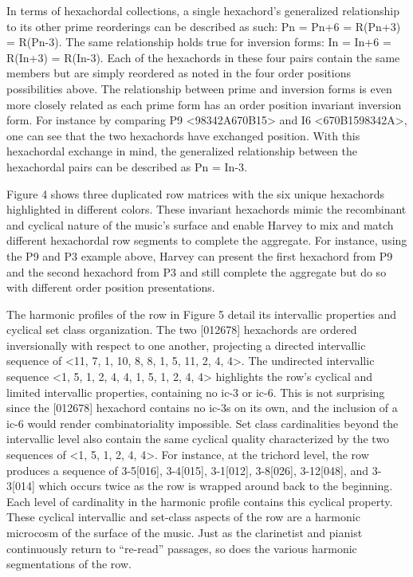 In terms of hexachordal collections, a single hexachord's generalized relationship to its other prime reorderings can be described as such: Pn = Pn+6 = R(Pn+3) = R(Pn-3). The same relationship holds true for inversion forms: In = In+6 = R(In+3) = R(In-3). Each of the hexachords in these four pairs contain the same members but are simply reordered as noted in the four order positions possibilities above. The relationship between prime and inversion forms is even more closely related as each prime form has an order position invariant inversion form. For instance by comparing P9 <98342A670B15> and I6 <670B1598342A>, one can see that the two hexachords have exchanged position. With this hexachordal exchange in mind, the generalized relationship between the hexachordal pairs can be described as Pn = In-3.

Figure 4 shows three duplicated row matrices with the six unique hexachords highlighted in different colors. These invariant hexachords mimic the recombinant and cyclical nature of the music's surface and enable Harvey to mix and match different hexachordal row segments to complete the aggregate. For instance, using the P9 and P3 example above, Harvey can present the first hexachord from P9 and the second hexachord from P3 and still complete the aggregate but do so with different order position presentations.

The harmonic profiles of the row in Figure 5 detail its intervallic properties and cyclical set class organization. The two [012678] hexachords are ordered inversionally with respect to one another, projecting a directed intervallic sequence of <11, 7, 1, 10, 8, 8, 1, 5, 11, 2, 4, 4>. The undirected intervallic sequence <1, 5, 1, 2, 4, 4, 1, 5, 1, 2, 4, 4> highlights the row's cyclical and limited intervallic properties, containing no ic-3 or ic-6. This is not surprising since the [012678] hexachord contains no ic-3s on its own, and the inclusion of a ic-6 would render combinatoriality impossible. Set class cardinalities beyond the intervallic level also contain the same cyclical quality characterized by the two sequences of <1, 5, 1, 2, 4, 4>. For instance, at the trichord level, the row produces a sequence of 3-5[016], 3-4[015], 3-1[012], 3-8[026], 3-12[048], and 3-3[014] which occurs twice as the row is wrapped around back to the beginning. Each level of cardinality in the harmonic profile contains this cyclical property. These cyclical intervallic and set-class aspects of the row are a harmonic microcosm of the surface of the music. Just as the clarinetist and pianist continuously return to ``re-read'' passages, so does the various harmonic segmentations of the row.

